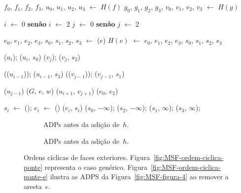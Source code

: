 \begin{algorithm}[htb]
\caption{\MSFaddEdge($G$, $e$, $u$, $f$, $v$, $g$, $w$)}
\label{Algo:MSFaddEdge}
\begin{algorithmic}[1]

\State $f_0$, $f_1$, $f_2$, $f_3$, $u_0$, $u_1$, $u_2$, $u_3$ $\gets$ $H(f)$
\State $g_0$, $g_1$, $g_2$, $g_3$, $v_0$, $v_1$, $v_2$, $v_3$ $\gets$ $H(g)$

 $i$ $\gets$ $0$ \textbf{senão} $i$ $\gets$ $2$
\EndIf
{} $j$ $\gets$ $0$ \textbf{senão} $j$ $\gets$ $2$
\EndIf


\State $e_0$, $e_1$, $e_2$, $e_3$, $s_0$, $s_1$, $s_2$, $s_3$ $\gets$ \LCOMakeOcto($e$)
\State $H(e)$ $\gets$ $e_0$, $e_1$, $e_2$, $e_3$, $s_0$, $s_1$, $s_2$, $s_3$

\State \LCOCycle($u_i$); \LCOMerge($u_i$, $s_0$)\label{Algo:MSFaddEdge:merges0}
\State \LCOCycle($v_j$); \LCOMerge($v_j$, $s_2$)\label{Algo:MSFaddEdge:merges2}


\State \LCOCycle(\treapPredecessor($u_{i-1}$)); \LCOMerge($u_{i-1}$, $s_3$)\label{Algo:MSFaddEdge:merges1}
\State \LCOCycle(\treapPredecessor($v_{j-1}$)); \LCOMerge($v_{j-1}$, $s_1$)\label{Algo:MSFaddEdge:merges3}

\label{Algo:MSFaddEdge:linha:deteccao-caso}
\State \LCOSplit($u_{j-1}$)
\State \MSFupdate($G$, $e$, $w$)
\Else
\State \LCOMerge($u_{i+1}$, $v_{j+1}$)
\State \LCOMerge($e_0$, $e_2$)
\EndIf
\end{algorithmic}
\end{algorithm}

\begin{algorithm}[htb]
\caption{\LCOMakeOcto($G$, $e$, $u$, $f$, $v$, $g$, $w$)}
\label{Algo:LCOMakeOcto}
\begin{algorithmic}[1]
\State $s_i$ $\gets$ \LCOMakeNode(); $e_i$ $\gets$ \LCOMakeNode()
\State \linkcutAddEdge($e_i$, $s_i$)
\EndFor
\State \LCOAddCost($s_0$, $-\infty$); \LCOAddCost($s_2$, $-\infty$);
\State \LCOAddCost($s_1$, $\infty$); \LCOAddCost($s_3$, $\infty$);

\end{algorithmic}
\end{algorithm}

\begin{figure}[htb]
\begin{subfigure}{.45\textwidth}
\scalebox{.6}{

}
\caption{ADPs antes da adição de~$h$.}
\label{fig:MSF-adiciona-ponte-1}
\end{subfigure}
\begin{subfigure}{.45\textwidth}
\scalebox{.6}{

	}
\caption{ADPs antes da adição de~$h$.}
\label{fig:MSF-adiciona-ponte-2}
\end{subfigure}
	\caption{Ordens cíclicas de faces exteriores. Figura~\ref{fig:MSF-ordem-ciclica-ponte} representa o caso genérico. Figura~\ref{fig:MSF-ordem-ciclica-ponte-e} ilustra as ADPS da Figura~\ref{fig:MSF-figura-4} ao remover a aresta~$e$.}
\end{figure}

